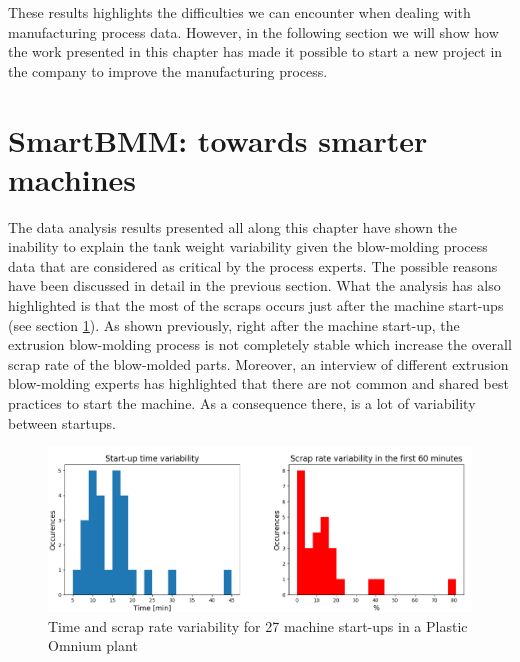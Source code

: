 These results highlights the difficulties we can encounter when dealing with manufacturing process data. However, in the following section we will show how the work presented in this chapter has made it possible to start a new project in the company to improve the manufacturing process. 


\section{SmartBMM: towards smarter machines}

The data analysis results presented all along this chapter have shown the inability to explain the tank weight variability given the blow-molding process data that are considered as critical by the process experts. The possible reasons have been discussed in detail in the previous section. What the analysis has also highlighted is that the most of the scraps occurs just after the machine start-ups (see section \ref{}). As shown previously, right after the machine start-up, the extrusion blow-molding process is not completely stable which increase the overall scrap rate of the blow-molded parts. Moreover, an interview of different extrusion blow-molding experts has highlighted that there are not common and shared best practices to start the machine. As a consequence there, is a lot of variability between startups.
%
\begin{figure}
\centerline{\includegraphics[scale=0.7]{images/chapter_3/smartbmm_barchart.png}}
\caption{Time and scrap rate variability for 27 machine start-ups in a Plastic Omnium plant}
\label{fig:smartbmm_barchart}
\end{figure}
%
